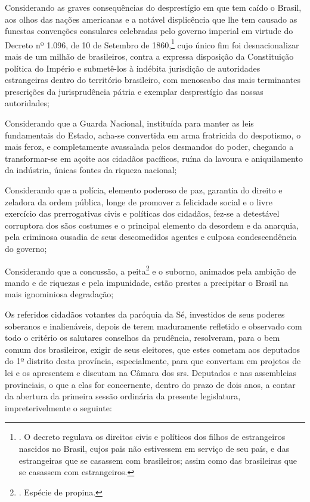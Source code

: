 Considerando as graves consequências do desprestígio em que tem caído o
Brasil, aos olhos das nações americanas e a notável displicência que lhe
tem causado as funestas convenções consulares celebradas pelo governo
imperial em virtude do Decreto nº 1.096, de 10 de Setembro de
1860,\footnote{. O decreto regulava os direitos civis e políticos dos
  filhos de estrangeiros nascidos no Brasil, cujos pais não estivessem
  em serviço de seu país, e das estrangeiras que se casassem com
  brasileiros; assim como das brasileiras que se casassem com
  estrangeiros.} cujo único fim foi desnacionalizar mais de um milhão de
brasileiros, contra a expressa disposição da Constituição política do
Império e submetê-los à indébita jurisdição de autoridades estrangeiras
dentro do território brasileiro, com menoscabo das mais terminantes
prescrições da jurisprudência pátria e exemplar desprestígio das nossas
autoridades;

Considerando que a Guarda Nacional, instituída para manter as leis
fundamentais do Estado, acha-se convertida em arma fratricida do
despotismo, o mais feroz, e completamente avassalada pelos desmandos do
poder, chegando a transformar-se em açoite aos cidadãos pacíficos, ruína
da lavoura e aniquilamento da indústria, únicas fontes da riqueza
nacional;

Considerando que a polícia, elemento poderoso de paz, garantia do
direito e zeladora da ordem pública, longe de promover a felicidade
social e o livre exercício das prerrogativas civis e políticas dos
cidadãos, fez-se a detestável corruptora dos sãos costumes e o principal
elemento da desordem e da anarquia, pela criminosa ousadia de seus
descomedidos agentes e culposa condescendência do governo;

Considerando que a concussão, a peita\footnote{. Espécie de propina.} e
o suborno, animados pela ambição de mando e de riquezas e pela
impunidade, estão prestes a precipitar o Brasil na mais ignominiosa
degradação;

Os referidos cidadãos votantes da paróquia da Sé, investidos de seus
poderes soberanos e inalienáveis, depois de terem maduramente refletido
e observado com todo o critério os salutares conselhos da prudência,
resolveram, para o bem comum dos brasileiros, exigir de seus eleitores,
que estes cometam aos deputados do 1º distrito desta província,
especialmente, para que convertam em projetos de lei e os apresentem e
discutam na Câmara dos srs. Deputados e nas assembleias provinciais, o
que a elas for concernente, dentro do prazo de dois anos, a contar da
abertura da primeira sessão ordinária da presente legislatura,
impreterivelmente o seguinte:

